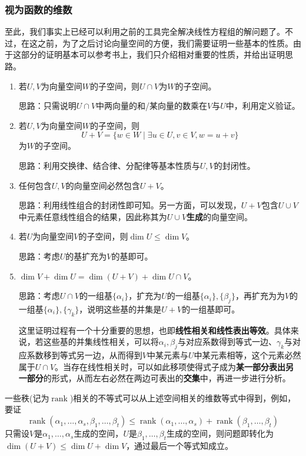 \documentclass[a4paper,UTF8,fontset=windows]{ctexart}
\DeclareMathOperator{\rank}{rank}
\newcommand*{\note}{\noindent *}
\begin{document}
\subsubsection{视为函数的维数}
至此，我们事实上已经可以利用之前的工具完全解决线性方程组的解问题了。不过，在这之前，为了之后讨论向量空间的方便，我们需要证明一些基本的性质。由于这部分的证明基本可以参考书上，我们只介绍相对重要的性质，并给出证明思路。
\begin{enumerate}
    \item 若$U,V$为向量空间$W$的子空间，则$U\cap V$为$W$的子空间。
    
    思路：只需说明$U\cap V$中两向量的和/某向量的数乘在$V$与$U$中，利用定义验证。

    \item 若$U,V$为向量空间$W$的子空间，则
    $$U+V=\{w\in W\mid\exists u\in U,v\in V,w=u+v\}$$
    为$W$的子空间。

    思路：利用交换律、结合律、分配律等基本性质与$U,V$的封闭性。

    \item 任何包含$U,V$的向量空间必然包含$U+V$。
    
    思路：利用线性组合的封闭性即可知。另一方面，可以发现，$U+V$包含$U\cup V$中元素任意线性组合的结果，因此称其为$U\cup V$\textbf{生成}的向量空间。

    \item 若$U$为向量空间$V$的子空间，则$\dim U\le \dim V$。
    
    思路：考虑$U$的基扩充为$V$的基即可。
    
    \item $\dim V+\dim U=\dim(U+V)+\dim U\cap V$。
    
    思路：考虑$U\cap V$的一组基$\{\alpha_i\}$，扩充为$U$的一组基$\{\alpha_i\},\{\beta_j\}$，再扩充为为$V$的一组基$\{\alpha_i\},\{\gamma_k\}$，说明这些基的并集是$U+V$的一组基即可。

    \note 这里证明过程有一个十分重要的思想，也即\textbf{线性相关和线性表出等效}。具体来说，若这些基的并集线性相关，可以将$\alpha_i,\beta_j$与对应系数得到等式一边、$\gamma_k$与对应系数移到等式另一边，从而得到$V$中某元素与$U$中某元素相等，这个元素必然属于$U\cap V$。当存在线性相关时，可以如此移项使得式子成为\textbf{某一部分表出另一部分}的形式，从而左右必然在两边可表出的\textbf{交集}中，再进一步进行分析。
\end{enumerate}

\note 一些秩(记为$\rank$)相关的不等式可以从上述空间相关的维数等式中得到，例如，要证
$$\rank(\alpha_1,\dots,\alpha_s,\beta_1,\dots,\beta_t)\le\rank(\alpha_1,\dots,\alpha_s)+\rank(\beta_1,\dots,\beta_t)$$
只需设$V$是$\alpha_1,\dots,\alpha_s$生成的空间，$U$是$\beta_1,\dots,\beta_t$生成的空间，则问题即转化为$\dim(U+V)\le\dim U+\dim V$，通过最后一个等式知成立。
\end{document}
